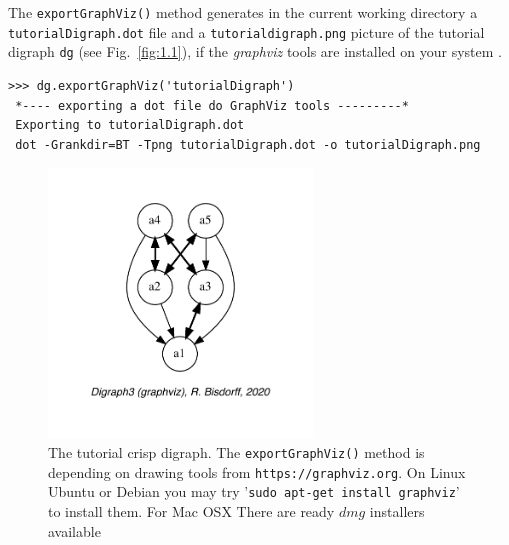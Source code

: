 The \texttt{exportGraphViz()} method generates in the current working directory a \texttt{tutorialDigraph.dot} file and a \texttt{tutorialdigraph.png} picture of the tutorial digraph \texttt{dg} (see Fig.~\vref{fig:1.1}), if the \emph{graphviz} tools are installed on your system \citep{graphViz}.
\begin{lstlisting}
>>> dg.exportGraphViz('tutorialDigraph')
 *---- exporting a dot file do GraphViz tools ---------*
 Exporting to tutorialDigraph.dot
 dot -Grankdir=BT -Tpng tutorialDigraph.dot -o tutorialDigraph.png
\end{lstlisting}
\begin{figure}[h]
\sidecaption[t]
\includegraphics[width=7cm]{Figures/1-1-tutorialDigraph.pdf}
\caption{The tutorial crisp digraph. The \texttt{exportGraphViz()} method is depending on drawing tools from \texttt{https://graphviz.org}. On Linux Ubuntu or Debian you may try '\texttt{sudo apt-get install graphviz}’ to install them. For Mac OSX There are ready $dmg$ installers available}
\label{fig:1.1}       %
\end{figure}

